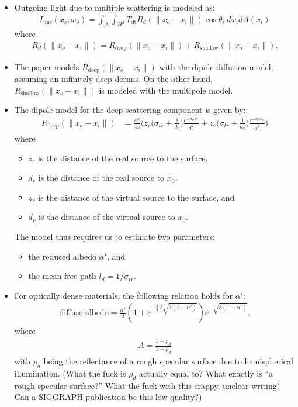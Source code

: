 \documentclass[10pt]{article}
\begin{document}
\begin{itemize}
  		\item Outgoing light due to multiple scattering is modeled as:
  		\begin{align*}
  			L_{\mathrm{ms}}(x_o, \omega_o) = \int_{A} \int_{H^2} T_{\mathrm{dt}} R_d(\| x_o - x_i \|) \cos \theta_i\ d\omega_i dA(x_i)
  		\end{align*}
  		where
  		\begin{align*}
  			R_d(\| x_o - x_i \|) = R_{\mathrm{deep}}(\| x_o - x_i \|) + R_{\mathrm{shallow}}(\| x_o - x_i \|).
  		\end{align*}

  		\item The paper models $R_{\mathrm{deep}}(\| x_o - x_i \|)$ with the dipole diffusion model, assuming an infinitely deep dermis.  On the other hand, $R_{\mathrm{shallow}}(\| x_o - x_i \|)$ is modeled with the multipole model.

  		\item The dipole model for the deep scattering component is given by:
  		\begin{align*}
  			R_{\mathrm{deep}}(\| x_o - x_i \|)
  			&= \frac{\alpha'}{4\pi} \bigg( z_r \Big( \sigma_{tr} + \frac{1}{d_r} \Big) \frac{e^{-\sigma_{tr} d_r}}{d_r^2} + z_v\Big( \sigma_{tr} + \frac{1}{d_v} \Big) \frac{e^{-\sigma_{tr}d_v}}{d_v^2} \bigg)
  		\end{align*}
      where
      \begin{itemize}
        \item $z_r$ is the distance of the real source to the surface,
        \item $d_r$ is the distance of the real source to $x_0$,
        \item $z_v$ is the distance of the virtual source to the surface, and
        \item $d_v$ is the distance of the virtual source to $x_0$.
      \end{itemize}
      The model thus requires us to estimate two parameters:
      \begin{itemize}
        \item the reduced albedo $\alpha'$, and
        \item the mean free path $l_d = 1/\sigma_{tr}$.
      \end{itemize}

      \item For optically dense materials, the following relation holds for $\alpha'$:
      \begin{align*}
        \mbox{diffuse albedo} = \frac{\alpha'}{2}( 1 + e^{-\frac{4}{3}A \sqrt{3(1-\alpha')}} ) e^{-\sqrt{3(1-\alpha')}}.
      \end{align*}
      where
      \begin{align*}
        A = \frac{1 + \rho_d}{ 1 - \rho_d}
      \end{align*}
      with $\rho_d$ being the reflectance of a rough specular surface due to hemispherical illumination.  (What the fuck is $\rho_d$ actually equal to?  What exactly is ``a rough specular surface?''  What the fuck with this crappy, unclear writing!  Can a SIGGRAPH publication be this low quality?)


\end{itemize}
\end{document}
